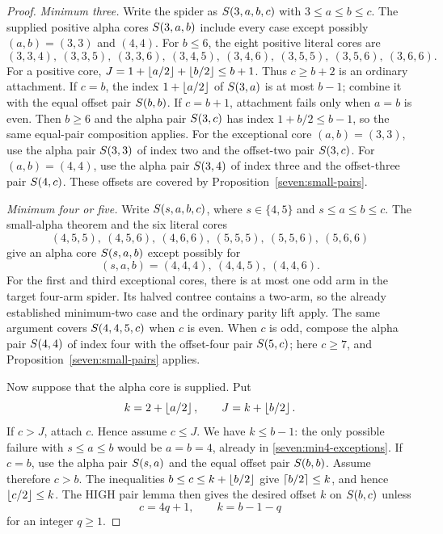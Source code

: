 \begin{proof}
\medskip\noindent
\emph{Minimum three.}
Write the spider as $S\!\left(3,a,b,c\right)$ with $3\le a\le b\le c$.
The supplied positive alpha cores $S\!\left(3,a,b\right)$ include every case
except possibly $(a,b)=(3,3)$ and $(4,4)$.  For $b\le6$, the
eight positive literal cores are
\[
 (3,3,4),\ (3,3,5),\ (3,3,6),\ (3,4,5),\
 (3,4,6),\ (3,5,5),\ (3,5,6),\ (3,6,6).
\]
For a positive core, $J=1+\left\lfloor a/2\right\rfloor+\left\lfloor b/2\right\rfloor\le b+1$.
Thus $c\ge b+2$ is an ordinary attachment.  If $c=b$, the index
$1+\left\lfloor a/2\right\rfloor$ of $S\!\left(3,a\right)$ is at most $b-1$; combine it with
the equal offset pair $S\!\left(b,b\right)$.  If $c=b+1$, attachment fails
only when $a=b$ is even.  Then $b\ge6$ and the alpha pair
$S\!\left(3,c\right)$ has index $1+b/2\le b-1$, so the same equal-pair
composition applies.  For the exceptional core $(a,b)=(3,3)$, use
the alpha pair $S\!\left(3,3\right)$ of index two and the offset-two pair
$S\!\left(3,c\right)$.  For $(a,b)=(4,4)$, use the alpha pair $S\!\left(3,4\right)$ of
index three and the offset-three pair $S\!\left(4,c\right)$.  These offsets
are covered by Proposition~\ref{seven:small-pairs}.

\medskip\noindent
\emph{Minimum four or five.}
Write $S\!\left(s,a,b,c\right)$, where $s\in\{4,5\}$ and
$s\le a\le b\le c$.  The small-alpha theorem and the six literal
cores
\[
 (4,5,5),\ (4,5,6),\ (4,6,6),\
 (5,5,5),\ (5,5,6),\ (5,6,6)
\]
give an alpha core $S\!\left(s,a,b\right)$ except possibly for
\begin{equation}\label{seven:min4-exceptions}
 (s,a,b)=(4,4,4),\ (4,4,5),\ (4,4,6).
\end{equation}
For the first and third exceptional cores, there is at most one odd
arm in the target four-arm spider.  Its halved contree contains a
two-arm, so the already established minimum-two case and the ordinary
parity lift apply.  The same argument covers $S\!\left(4,4,5,c\right)$ when
$c$ is even.  When $c$ is odd, compose the alpha pair $S\!\left(4,4\right)$
of index four with the offset-four pair $S\!\left(5,c\right)$; here $c\ge7$,
and Proposition~\ref{seven:small-pairs} applies.

Now suppose that the alpha core is supplied.  Put
\[
 k=2+\left\lfloor a/2\right\rfloor,\qquad J=k+\left\lfloor b/2\right\rfloor.
\]
If $c>J$, attach $c$.  Hence assume $c\le J$.  We have $k\le b-1$:
the only possible failure with $s\le a\le b$ would be $a=b=4$,
already in \eqref{seven:min4-exceptions}.  If $c=b$, use the alpha
pair $S\!\left(s,a\right)$ and the equal offset pair $S\!\left(b,b\right)$.
Assume therefore $c>b$.  The inequalities
$b\le c\le k+\left\lfloor b/2\right\rfloor$ give $\left\lceil b/2\right\rceil\le k$, and hence
$\left\lfloor c/2\right\rfloor\le k$.  The HIGH pair lemma then gives the desired
offset $k$ on $S\!\left(b,c\right)$ unless
\begin{equation}\label{seven:small-resonance}
 c=4q+1,\qquad k=b-1-q
\end{equation}
for an integer $q\ge1$.


\end{proof}
